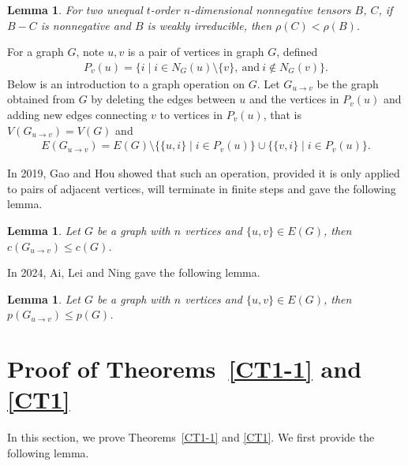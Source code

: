 \documentclass[preprint,12pt]{elsarticle}
\newtheorem{lem}[thm]{Lemma}
\begin{document}
        \begin{lem}\label{2L4}\cite{Khan2015}
            For two unequal $t$-order $n$-dimensional nonnegative tensors $B$, $C$, if $B-C$ is nonnegative and $B$ is weakly irreducible, then $\rho(C)<\rho(B)$.
        \end{lem}

        For a graph $G$, note $u, v$ is a pair of vertices in graph $G$, defined
            \begin{align*}
                P_v(u)=\{i\mid i\in N_{G}(u)\setminus\{v\},\mathrm{~and~}i\notin N_{G}(v)\}.
            \end{align*}
        Below is an introduction to a graph operation on $G $. Let $G_{u \to v}$ be the graph obtained from $G$ by deleting the edges between $u$ and the vertices in $P_v(u)$ and adding new edges connecting $v$ to vertices in $P_v(u)$, that is $V(G_{u \to v})=V(G)$ and
            \begin{align*}
                E(G_{u \to v}) = E(G) \setminus \{ \{u, i\} \mid i \in P_v(u) \} \cup \{ \{v, i\} \mid i \in P_v(u) \}.
            \end{align*}

        In 2019, Gao and Hou \cite{Gao2019} showed that such an operation, provided it is only applied to pairs of adjacent vertices, will terminate in finite steps and gave the following lemma.



        \begin{lem}\label{Gao1}\cite{Gao2019}
            Let $G$ be a graph with $n$ vertices and $\{u,v\} \in E(G)$, then $c(G_{u \to v}) \leq c(G)$.
        \end{lem}
        In 2024, Ai, Lei and Ning gave the following lemma.
        \begin{lem}\label{L4-1}\cite{Ai2024}
            Let $G$ be a graph with $n$ vertices and $\{u,v\} \in E(G)$, then $p(G_{u \to v})\leq p(G)$.
        \end{lem}

\section{Proof of Theorems~\ref{CT1-1} and \ref{CT1}}



        In this section, we prove Theorems~\ref{CT1-1} and \ref{CT1}. We first provide the following lemma.
\end{document}
